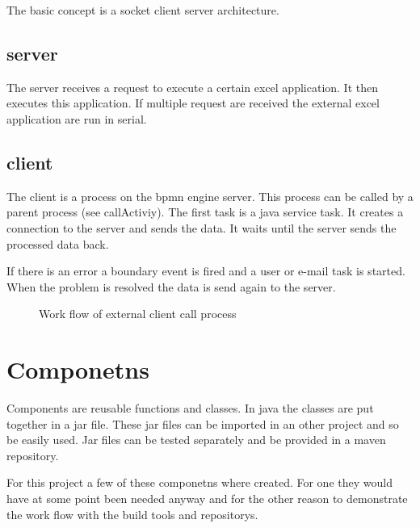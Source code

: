 \documentclass[paper=a4,twoside=false,BCOR=0mm,DIV=calc,fontsize=12pt]{scrartcl}
\begin{document}
The basic concept is a socket client server architecture. 

\subsection{server}

The server receives a request to execute a certain excel application. It then executes this application. If multiple request are received the external excel application are run in serial.





\subsection{client}

The client is a process on the bpmn engine server. This process can be called by a parent process (see callActiviy). 
The first task is a java service task. It creates a connection to the server and sends the data. 
It waits until the server sends the processed data back.

If there is an error a boundary event is fired and a user or e-mail task is started. When the problem is resolved the 
data is send again to the server.


\begin{figure}
    \begin{center}
    \end{center}
  \caption{Work flow of external client call process}
  \label{externClientWorkflow}
\end{figure} 



\section{Componetns}
Components are reusable functions and classes. In java the classes are put together in a jar file. These jar files can be imported in an other project and so be easily used.
Jar files can be tested separately and be provided in a maven repository.

For this project a few of these componetns where created. For one they would have at some point been needed anyway and for the other reason to demonstrate the work flow with the build tools and repositorys.
\end{document}
